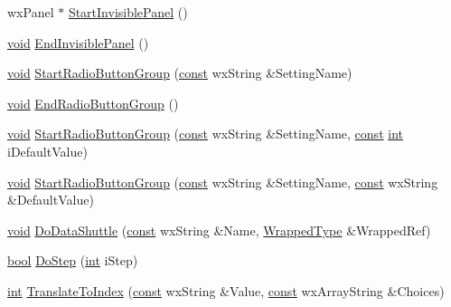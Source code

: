 \begin{DoxyCompactItemize}
\item 
wx\+Panel $\ast$ \hyperlink{class_shuttle_gui_base_af8276be9b2aa777f75899a72e73c6225}{Start\+Invisible\+Panel} ()
\item 
\hyperlink{sound_8c_ae35f5844602719cf66324f4de2a658b3}{void} \hyperlink{class_shuttle_gui_base_a32bc77d559cab3c697fbea8dc1c16867}{End\+Invisible\+Panel} ()
\item 
\hyperlink{sound_8c_ae35f5844602719cf66324f4de2a658b3}{void} \hyperlink{class_shuttle_gui_base_aad116fbb0deceae4a8493e516059fbab}{Start\+Radio\+Button\+Group} (\hyperlink{getopt1_8c_a2c212835823e3c54a8ab6d95c652660e}{const} wx\+String \&Setting\+Name)
\item 
\hyperlink{sound_8c_ae35f5844602719cf66324f4de2a658b3}{void} \hyperlink{class_shuttle_gui_base_a96b3f9235203d43d38f7abfebae23688}{End\+Radio\+Button\+Group} ()
\item 
\hyperlink{sound_8c_ae35f5844602719cf66324f4de2a658b3}{void} \hyperlink{class_shuttle_gui_base_a0c922394c6db6e6bc942c4fd9ded8122}{Start\+Radio\+Button\+Group} (\hyperlink{getopt1_8c_a2c212835823e3c54a8ab6d95c652660e}{const} wx\+String \&Setting\+Name, \hyperlink{getopt1_8c_a2c212835823e3c54a8ab6d95c652660e}{const} \hyperlink{xmltok_8h_a5a0d4a5641ce434f1d23533f2b2e6653}{int} i\+Default\+Value)
\item 
\hyperlink{sound_8c_ae35f5844602719cf66324f4de2a658b3}{void} \hyperlink{class_shuttle_gui_base_aead17ba00994c6b196e7f522895e9480}{Start\+Radio\+Button\+Group} (\hyperlink{getopt1_8c_a2c212835823e3c54a8ab6d95c652660e}{const} wx\+String \&Setting\+Name, \hyperlink{getopt1_8c_a2c212835823e3c54a8ab6d95c652660e}{const} wx\+String \&Default\+Value)
\item 
\hyperlink{sound_8c_ae35f5844602719cf66324f4de2a658b3}{void} \hyperlink{class_shuttle_gui_base_a22c5d5a6a0a65830ae9e8e4d369044d6}{Do\+Data\+Shuttle} (\hyperlink{getopt1_8c_a2c212835823e3c54a8ab6d95c652660e}{const} wx\+String \&Name, \hyperlink{class_wrapped_type}{Wrapped\+Type} \&Wrapped\+Ref)
\item 
\hyperlink{mac_2config_2i386_2lib-src_2libsoxr_2soxr-config_8h_abb452686968e48b67397da5f97445f5b}{bool} \hyperlink{class_shuttle_gui_base_aad95c487841658a0bd5bab5f61e95850}{Do\+Step} (\hyperlink{xmltok_8h_a5a0d4a5641ce434f1d23533f2b2e6653}{int} i\+Step)
\item 
\hyperlink{xmltok_8h_a5a0d4a5641ce434f1d23533f2b2e6653}{int} \hyperlink{class_shuttle_gui_base_a5dd7fb69f753f17538aeabe242cc63e8}{Translate\+To\+Index} (\hyperlink{getopt1_8c_a2c212835823e3c54a8ab6d95c652660e}{const} wx\+String \&Value, \hyperlink{getopt1_8c_a2c212835823e3c54a8ab6d95c652660e}{const} wx\+Array\+String \&Choices)

\end{DoxyCompactItemize}
